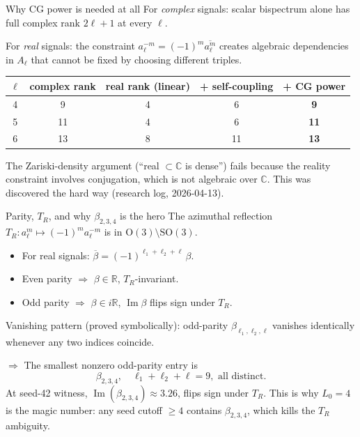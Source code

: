 \documentclass[10pt,aspectratio=169]{beamer}
\newcommand{\R}{\mathbb{R}}
\newcommand{\C}{\mathbb{C}}
\newcommand{\SO}{\mathrm{SO}}
\newcommand{\OG}{\mathrm{O}}
\newcommand{\im}{\operatorname{Im}}
\begin{document}
\begin{frame}{Why CG power is needed at all}
For \emph{complex} signals: scalar bispectrum alone has full
complex rank $2\ell+1$ at every $\ell$.
\vspace{0.4em}

For \emph{real} signals: the constraint
$a_\ell^{-m} = (-1)^m \overline{a_\ell^m}$ creates algebraic
dependencies in $A_\ell$ that \alert{cannot be fixed by choosing different triples}.

\centering\small
\begin{tabular}{ccccc}
\toprule
$\ell$ & complex rank & real rank (linear) & + self-coupling & + CG power \\
\midrule
4 & 9 & 4 & 6 & \textbf{9} \\
5 & 11 & 4 & 6 & \textbf{11} \\
6 & 13 & 8 & 11 & \textbf{13} \\
\bottomrule
\end{tabular}
\vspace{0.6em}

The Zariski-density argument (``real $\subset \C$ is dense'') \alert{fails} because
the reality constraint involves conjugation, which is not algebraic over $\C$.
This was discovered the hard way (research log, 2026-04-13).
\end{frame}

\begin{frame}{Parity, $T_R$, and why $\beta_{2,3,4}$ is the hero}
The azimuthal reflection $T_R: a_\ell^m \mapsto (-1)^m a_\ell^{-m}$
is in $\OG(3) \setminus \SO(3)$.
\begin{itemize}
  \item For real signals: $\overline{\beta} = (-1)^{\ell_1+\ell_2+\ell}\,\beta$.
  \item Even parity $\Rightarrow$ $\beta \in \R$, $T_R$-invariant.
  \item Odd parity $\Rightarrow$ $\beta \in i\R$, $\im\beta$ flips sign under $T_R$.
\end{itemize}
\vspace{0.4em}
Vanishing pattern (proved symbolically): odd-parity $\beta_{\ell_1,\ell_2,\ell}$
\alert{vanishes identically} whenever any two indices coincide.

$\Rightarrow$ The smallest nonzero odd-parity entry is
\[
  \boxed{\beta_{2,3,4}}, \quad \ell_1+\ell_2+\ell = 9, \text{ all distinct.}
\]
At seed-42 witness, $\im(\beta_{2,3,4}) \approx 3.26$, flips sign under $T_R$.
This is why $L_0 = 4$ is the magic number: any seed cutoff $\ge 4$
contains $\beta_{2,3,4}$, which kills the $T_R$ ambiguity.
\end{frame}
\end{document}
